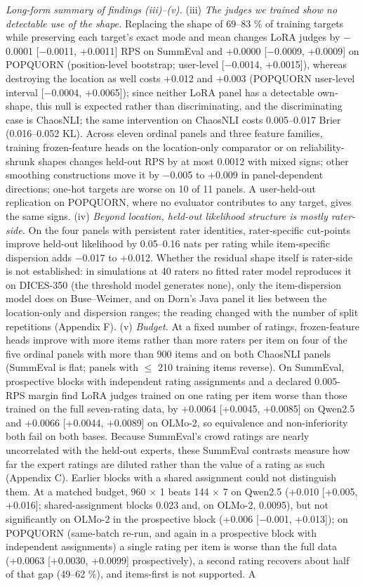 \documentclass[10pt,twocolumn]{article}
\begin{document}
\emph{Long-form summary of findings (iii)--(v).} (iii) \emph{The judges we trained show no detectable use of the shape.} Replacing the shape of 69--83 \% of training targets while preserving each target's exact mode and mean changes LoRA judges by $-$0.0001 {[}$-$0.0011, +0.0011{]} RPS on SummEval and +0.0000 {[}$-$0.0009, +0.0009{]} on POPQUORN (position-level bootstrap; user-level {[}$-$0.0014, +0.0015{]}), whereas destroying the location as well costs +0.012 and +0.003 (POPQUORN user-level interval {[}$-$0.0004, +0.0065{]}); since neither LoRA panel has a detectable own-shape, this null is expected rather than discriminating, and the discriminating case is ChaosNLI; the same intervention on ChaosNLI costs 0.005--0.017 Brier (0.016--0.052 KL). Across eleven ordinal panels and three feature families, training frozen-feature heads on the location-only comparator or on reliability-shrunk shapes changes held-out RPS by at most 0.0012 with mixed signs; other smoothing constructions move it by $-$0.005 to +0.009 in panel-dependent directions; one-hot targets are worse on 10 of 11 panels. A user-held-out replication on POPQUORN, where no evaluator contributes to any target, gives the same signs. (iv) \emph{Beyond location, held-out likelihood structure is mostly rater-side.} On the four panels with persistent rater identities, rater-specific cut-points improve held-out likelihood by 0.05--0.16 nats per rating while item-specific dispersion adds $-$0.017 to +0.012. Whether the residual shape itself is rater-side is not established: in simulations at 40 raters no fitted rater model reproduces it on DICES-350 (the threshold model generates none), only the item-dispersion model does on Buse--Weimer, and on Dorn's Java panel it lies between the location-only and dispersion ranges; the reading changed with the number of split repetitions (Appendix F). (v) \emph{Budget.} At a fixed number of ratings, frozen-feature heads improve with more items rather than more raters per item on four of the five ordinal panels with more than 900 items and on both ChaosNLI panels (SummEval is flat; panels with $\leq$ 210 training items reverse). On SummEval, prospective blocks with independent rating assignments and a declared 0.005-RPS margin find LoRA judges trained on one rating per item worse than those trained on the full seven-rating data, by +0.0064 {[}+0.0045, +0.0085{]} on Qwen2.5 and +0.0066 {[}+0.0044, +0.0089{]} on OLMo-2, so equivalence and non-inferiority both fail on both bases. Because SummEval's crowd ratings are nearly uncorrelated with the held-out experts, these SummEval contrasts measure how far the expert ratings are diluted rather than the value of a rating as such (Appendix C). Earlier blocks with a shared assignment could not distinguish them. At a matched budget, 960 $\times$ 1 beats 144 $\times$ 7 on Qwen2.5 (+0.010 {[}+0.005, +0.016{]}; shared-assignment blocks 0.023 and, on OLMo-2, 0.0095), but not significantly on OLMo-2 in the prospective block (+0.006 {[}$-$0.001, +0.013{]}); on POPQUORN (same-batch re-run, and again in a prospective block with independent assignments) a single rating per item is worse than the full data (+0.0063 {[}+0.0030, +0.0099{]} prospectively), a second rating recovers about half of that gap (49--62 \%), and items-first is not supported. A 
\end{document}
